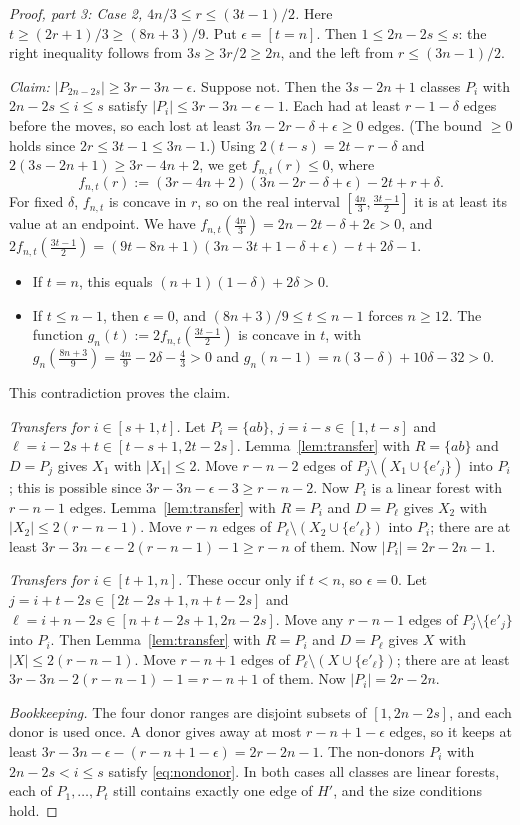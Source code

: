 \documentclass[11pt]{amsart}
\theoremstyle{definition}
\theoremstyle{remark}
\begin{document}
\begin{proof}[Proof, part 3: Case 2, $4n/3\le r\le(3t-1)/2$]
Here $t\ge(2r+1)/3\ge(8n+3)/9$. Put $\epsilon=[t=n]$. Then $1\le 2n-2s\le s$: the right
inequality follows from $3s\ge 3r/2\ge 2n$, and the left from $r\le(3n-1)/2$.

\emph{Claim: $|P_{2n-2s}|\ge 3r-3n-\epsilon$.} Suppose not. Then the $3s-2n+1$ classes
$P_i$ with $2n-2s\le i\le s$ satisfy $|P_i|\le 3r-3n-\epsilon-1$. Each had at least
$r-1-\delta$ edges before the moves, so each lost at least $3n-2r-\delta+\epsilon\ge0$ edges.
(The bound $\ge0$ holds since $2r\le 3t-1\le 3n-1$.) Using $2(t-s)=2t-r-\delta$ and
$2(3s-2n+1)\ge 3r-4n+2$, we get $f_{n,t}(r)\le0$, where
\[
f_{n,t}(r):=(3r-4n+2)(3n-2r-\delta+\epsilon)-2t+r+\delta .
\]
For fixed $\delta$, $f_{n,t}$ is concave in $r$, so on the real interval
$[\tfrac{4n}{3},\tfrac{3t-1}{2}]$ it is at least its value at an endpoint. We have
$f_{n,t}(\tfrac{4n}{3})=2n-2t-\delta+2\epsilon>0$, and
$2f_{n,t}(\tfrac{3t-1}{2})=(9t-8n+1)(3n-3t+1-\delta+\epsilon)-t+2\delta-1$.
\begin{itemize}[leftmargin=*]
\item If $t=n$, this equals $(n+1)(1-\delta)+2\delta>0$.
\item If $t\le n-1$, then $\epsilon=0$, and $(8n+3)/9\le t\le n-1$ forces $n\ge12$. The
function $g_n(t):=2f_{n,t}(\tfrac{3t-1}{2})$ is concave in $t$, with
$g_n(\tfrac{8n+3}{9})=\tfrac{4n}{9}-2\delta-\tfrac43>0$ and
$g_n(n-1)=n(3-\delta)+10\delta-32>0$.
\end{itemize}
This contradiction proves the claim.

\emph{Transfers for $i\in[s+1,t]$.} Let $P_i=\{ab\}$, $j=i-s\in[1,t-s]$ and
$\ell=i-2s+t\in[t-s+1,2t-2s]$. Lemma~\ref{lem:transfer} with $R=\{ab\}$ and $D=P_j$ gives $X_1$
with $|X_1|\le2$. Move $r-n-2$ edges of $P_j\setminus(X_1\cup\{e'_j\})$ into $P_i$; this is
possible since $3r-3n-\epsilon-3\ge r-n-2$. Now $P_i$ is a linear forest with $r-n-1$ edges.
Lemma~\ref{lem:transfer} with $R=P_i$ and $D=P_\ell$ gives $X_2$ with
$|X_2|\le 2(r-n-1)$. Move $r-n$ edges of $P_\ell\setminus(X_2\cup\{e'_\ell\})$ into $P_i$;
there are at least $3r-3n-\epsilon-2(r-n-1)-1\ge r-n$ of them. Now $|P_i|=2r-2n-1$.

\emph{Transfers for $i\in[t+1,n]$.} These occur only if $t<n$, so $\epsilon=0$. Let
$j=i+t-2s\in[2t-2s+1,n+t-2s]$ and $\ell=i+n-2s\in[n+t-2s+1,2n-2s]$. Move any $r-n-1$ edges of
$P_j\setminus\{e'_j\}$ into $P_i$. Then Lemma~\ref{lem:transfer} with $R=P_i$ and $D=P_\ell$
gives $X$ with $|X|\le2(r-n-1)$. Move $r-n+1$ edges of $P_\ell\setminus(X\cup\{e'_\ell\})$; there
are at least $3r-3n-2(r-n-1)-1=r-n+1$ of them. Now $|P_i|=2r-2n$.

\emph{Bookkeeping.} The four donor ranges are disjoint subsets of $[1,2n-2s]$, and each donor
is used once. A donor gives away at most $r-n+1-\epsilon$ edges, so it keeps at least
$3r-3n-\epsilon-(r-n+1-\epsilon)=2r-2n-1$. The non-donors $P_i$ with $2n-2s<i\le s$ satisfy
\eqref{eq:nondonor}. In both cases all classes are linear forests, each of $P_1,\dots,P_t$ still
contains exactly one edge of $H'$, and the size conditions hold.
\end{proof}
\end{document}
